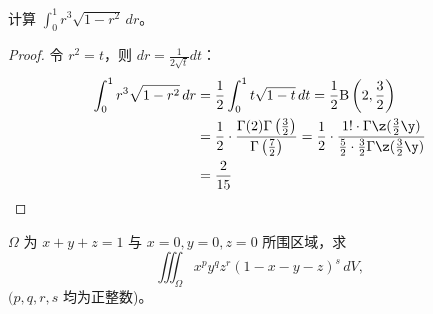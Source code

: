 \begin{example}
计算 $\displaystyle \int_{0}^{1} r^3 \sqrt{1-r^2} \, dr$。
\end{example}

\begin{proof}
令 $r^2 = t$，则 $\displaystyle dr = \frac{1}{2\sqrt{t}} dt$：
\begin{align*}
\int_{0}^{1} r^3 \sqrt{1-r^2} \, dr 
&= \frac{1}{2} \int_{0}^{1} t \sqrt{1-t} \, dt 
= \frac{1}{2} \mathrm{B}\left(2, \frac{3}{2}\right) \\
&= \frac{1}{2} \cdot \frac{\Gamma(2) \Gamma\left(\frac{3}{2}\right)}{\Gamma\left(\frac{7}{2}\right)}
= \frac{1}{2} \cdot \frac{1!\cdot \Gamma \z( \frac{3}{2}\y)}{\frac{5}{2}\cdot\frac{3}{2}\Gamma\z( \frac{3}{2} \y)} \\
&= \frac{2}{15}
\end{align*}
\end{proof}

\begin{example}[复旦2023]
$\displaystyle \Omega$ 为 $\displaystyle x + y + z = 1$ 与 $\displaystyle x = 0, y = 0, z = 0$ 所围区域，求
\[
\iiint_{\Omega} x^p y^q z^r (1 - x - y - z)^s \, dV,
\]
$\displaystyle (p, q, r, s$ 均为正整数)。
\end{example}


